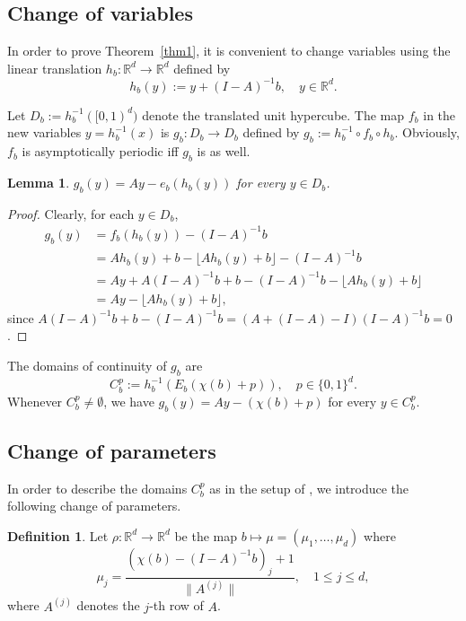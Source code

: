 \documentclass[12pt,reqno,a4paper]{amsart}%
\newtheorem{lemma}{Lemma}
\theoremstyle{definition}
\newtheorem{defn}{Definition}
\theoremstyle{remark}
\newcommand{\Rr}{\mathbb{R}}
\begin{document}
{{\subsection{Change of variables}\label{covar}

In order to prove Theorem~\ref{thm1}, it is convenient to change variables using the linear translation $h_b\colon \Rr^d\to\Rr^d$ defined by
\begin{equation}\label{hby} 
h_b(y) := y + (I-A)^{-1}b,\quad y\in\mathbb{R}^d.
\end{equation}

Let $D_b := h_b^{-1}([0,1)^d)$ denote the translated {unit hypercube}. The map $f_b$ in the new variables $y=h_b^{-1}(x)$ is $g_b\colon D_b\to D_b$ defined by $g_b:=h_b^{-1}\circ f_b\circ h_b$. Obviously, $f_b$ is asymptotically periodic iff $g_b$ is {as well}.
\begin{lemma}\label{lem:changevar}
$g_b(y) = Ay - e_b(h_b(y))$ for every $y\in D_b$.
\end{lemma}
\begin{proof}
Clearly, for each $y\in D_b$, 
\begin{align*}
g_b(y)&=f_b(h_b(y))-(I-A)^{-1}b\\
&= Ah_b(y)+b-\lfloor A h_b(y)+b\rfloor - (I-A)^{-1}b\\
&=Ay+A(I-A)^{-1}b+b-(I-A)^{-1}b - \lfloor A h_b(y)+b\rfloor\\
&=Ay - \lfloor A h_b(y)+b\rfloor,
\end{align*}
since $A(I-A)^{-1}b+b-(I-A)^{-1}b=(A+(I-A)-I)(I-A)^{-1}b=0$.
\end{proof}
The domains of continuity of $g_b$ are 
\begin{equation}\label{eq:Cbp}
C_b^p:=h_b^{-1}(E_b(\chi(b)+p)),\quad p\in\{0,1\}^d.
\end{equation}
Whenever $C_b^p\neq\emptyset$, we have $g_b(y)=Ay-(\chi(b)+p)$ for every $y\in C_b^p$.
\subsection{Change of parameters}
 In order to describe the domains $C_b^p$ as in the setup of {\cite{GaivaoPires2024}}, we introduce the following change of parameters.
\begin{defn}
Let $\rho\colon \Rr^d\to \Rr^d$ be the map $b\mapsto \mu=(\mu_1,\ldots,\mu_d)$ where
$$
\mu_{{j}} = \frac{(\chi(b)-(I-A)^{-1}b)_{{j}} +1}{\|A^{({{j}})}\|},\quad {1\le j\le d},
$$
where $A^{{(j)}}$ denotes the ${j}$-th row of $A$.
\end{defn}

}}
\end{document}
